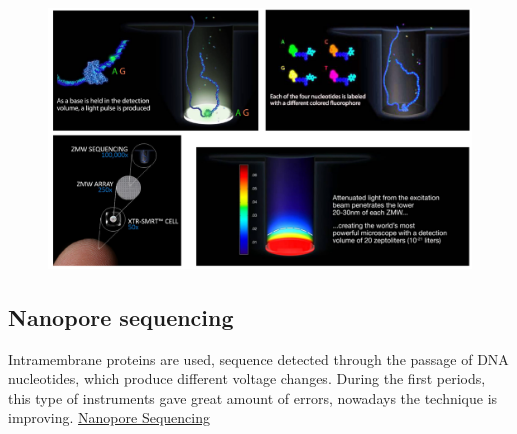 \begin{figure}[h]
\caption{}
\centering
\includegraphics[width=1\textwidth]{PacBIO}
\label{}
\end{figure}


\subsection{Nanopore sequencing}
Intramembrane proteins are used, sequence detected through the passage of DNA nucleotides, which produce different voltage changes. During the first periods, this type of instruments gave great amount of errors, nowadays the technique is improving.
\href{https://www.youtube.com/watch?v=E9-Rm5AoZGw}{Nanopore Sequencing}
